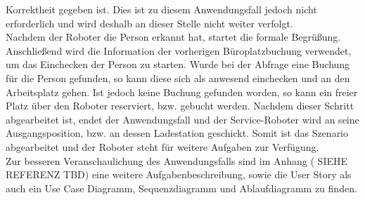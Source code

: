     Korrektheit gegeben ist. Dies ist zu diesem Anwendungsfall jedoch nicht erforderlich und wird deshalb an dieser Stelle 
    nicht weiter verfolgt. 
    \\
    Nachdem der Roboter die Person erkannt hat, startet die formale Begrüßung. Anschließend wird die Information der 
    vorherigen Büroplatzbuchung verwendet, um das Einchecken der Person zu starten. Wurde bei der Abfrage eine Buchung für 
    die Person gefunden, so kann diese sich als anwesend einchecken und an den Arbeitsplatz gehen. Ist jedoch keine 
    Buchung gefunden worden, so kann ein freier Platz über den Roboter reserviert, bzw. gebucht werden. Nachdem dieser 
    Schritt abgearbeitet ist, endet der Anwendungsfall und der Service-Roboter wird an seine Ausgangsposition, bzw. an dessen 
    Ladestation geschickt. Somit ist das Szenario abgearbeitet und der Roboter steht für weitere Aufgaben zur Verfügung. 
    \\
    \linebreak
    Zur besseren Veranschaulichung des Anwendungsfalls sind im Anhang (%
    SIEHE REFERENZ TBD) eine weitere Aufgabenbeschreibung, sowie die User Story als auch ein Use Case Diagramm, 
    Sequenzdiagramm und Ablaufdiagramm zu finden.

